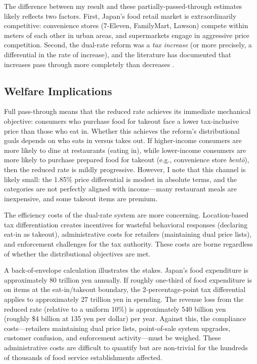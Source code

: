 \documentclass[12pt]{article}
\begin{document}
The difference between my result and these partially-passed-through estimates likely reflects two factors. First, Japan's food retail market is extraordinarily competitive: convenience stores (7-Eleven, FamilyMart, Lawson) compete within meters of each other in urban areas, and supermarkets engage in aggressive price competition. Second, the dual-rate reform was a \textit{tax increase} (or more precisely, a differential in the rate of increase), and the literature has documented that increases pass through more completely than decreases \citep{benzarti2020passthrough}.

\subsection{Welfare Implications}

Full pass-through means that the reduced rate achieves its immediate mechanical objective: consumers who purchase food for takeout face a lower tax-inclusive price than those who eat in. Whether this achieves the reform's distributional goals depends on who eats in versus takes out. If higher-income consumers are more likely to dine at restaurants (eating in), while lower-income consumers are more likely to purchase prepared food for takeout (e.g., convenience store \textit{bent\={o}}), then the reduced rate is mildly progressive. However, I note that this channel is likely small: the 1.85\% price differential is modest in absolute terms, and the categories are not perfectly aligned with income---many restaurant meals are inexpensive, and some takeout items are premium.

The efficiency costs of the dual-rate system are more concerning. Location-based tax differentiation creates incentives for wasteful behavioral responses (declaring eat-in as takeout), administrative costs for retailers (maintaining dual price lists), and enforcement challenges for the tax authority. These costs are borne regardless of whether the distributional objectives are met.

A back-of-envelope calculation illustrates the stakes. Japan's food expenditure is approximately 80 trillion yen annually. If roughly one-third of food expenditure is on items at the eat-in/takeout boundary, the 2-percentage-point tax differential applies to approximately 27 trillion yen in spending. The revenue loss from the reduced rate (relative to a uniform 10\%) is approximately 540 billion yen (roughly \$4 billion at 135 yen per dollar) per year. Against this, the compliance costs---retailers maintaining dual price lists, point-of-sale system upgrades, customer confusion, and enforcement activity---must be weighed. These administrative costs are difficult to quantify but are non-trivial for the hundreds of thousands of food service establishments affected.
\end{document}
